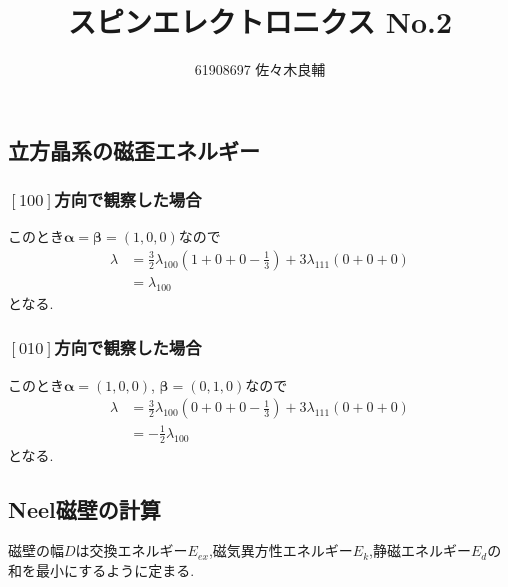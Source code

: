 \documentclass[uplatex,a4j,11pt,dvipdfmx]{jsarticle}
\begin{document}
\title{スピンエレクトロニクス No.2}
\author{61908697 佐々木良輔}
\date{}
\maketitle
\subsection*{立方晶系の磁歪エネルギー}
\subsubsection*{$[100]$方向で観察した場合}
このとき${\bm \alpha}={\bm \beta}=(1,0,0)$なので
\begin{align*}
  \lambda&=\frac{3}{2}\lambda_{100}\left(1+0+0-\frac{1}{3}\right)+3\lambda_{111}\left(0+0+0\right)\\
  &=\lambda_{100}
\end{align*}
となる.
\subsubsection*{$[010]$方向で観察した場合}
このとき${\bm \alpha}=(1,0,0)$, ${\bm \beta}=(0,1,0)$なので
\begin{align*}
  \lambda&=\frac{3}{2}\lambda_{100}\left(0+0+0-\frac{1}{3}\right)+3\lambda_{111}\left(0+0+0\right)\\
  &=-\frac{1}{2}\lambda_{100}
\end{align*}
となる.
\subsection*{Neel磁壁の計算}
磁壁の幅$D$は交換エネルギー$E_{ex}$,磁気異方性エネルギー$E_k$,静磁エネルギー$E_d$の和を最小にするように定まる.
\end{document}

